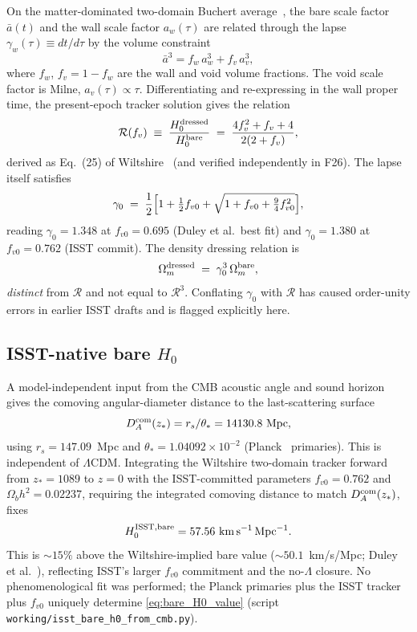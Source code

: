 \documentclass[aps,prd,twocolumn,nofootinbib,floatfix,superscriptaddress]{revtex4-2}
\begin{document}
On the matter-dominated two-domain Buchert
average~\cite{Wiltshire2007,Wiltshire2009}, the bare scale factor
$\bar a(t)$ and the wall scale factor $a_w(\tau)$ are related
through the lapse $\gamma_w(\tau) \equiv dt/d\tau$ by the volume
constraint
\begin{equation}
\bar a^3 = f_w\,a_w^3 + f_v\,a_v^3,
\end{equation}
where $f_w$, $f_v = 1-f_w$ are the wall and void volume
fractions. The void scale factor is Milne, $a_v(\tau) \propto \tau$.
Differentiating and re-expressing in the wall proper time, the
present-epoch tracker solution gives the relation
\begin{equation}
\label{eq:R_dressing}
\mathcal{R}(f_v) \;\equiv\; \frac{H_0^{\rm dressed}}{H_0^{\rm bare}}
\;=\; \frac{4f_v^2 + f_v + 4}{2(2 + f_v)},
\end{equation}
derived as Eq.~(25) of Wiltshire~\cite{WiltshirePRL2007} (and
verified independently in F26). The lapse itself satisfies
\begin{equation}
\gamma_0 \;=\; \frac{1}{2}\Bigl[1 + \tfrac{1}{2}f_{v0} +
   \sqrt{1 + f_{v0} + \tfrac{9}{4}f_{v0}^2}\Bigr],
\end{equation}
reading $\gamma_0 = 1.348$ at $f_{v0} = 0.695$ (Duley et al.\ best
fit) and $\gamma_0 = 1.380$ at $f_{v0} = 0.762$ (ISST commit). The
density dressing relation is
\begin{equation}
\Omega_m^{\rm dressed} \;=\; \gamma_0^3\,\Omega_m^{\rm bare},
\end{equation}
\emph{distinct} from $\mathcal{R}$ and not equal to
$\mathcal{R}^3$. Conflating $\gamma_0$ with $\mathcal{R}$ has
caused order-unity errors in earlier ISST drafts and is flagged
explicitly here.

\subsection{ISST-native bare $H_0$}
\label{sec:bare_h0}

A model-independent input from the CMB acoustic angle and sound
horizon gives the comoving angular-diameter distance to the
last-scattering surface
\begin{equation}
D_A^{\rm com}(z_*) = r_s/\theta_* = 14130.8~\text{Mpc},
\end{equation}
using $r_s = 147.09$~Mpc and $\theta_* = 1.04092\times 10^{-2}$
(Planck~\cite{Planck2018} primaries). This is independent of
$\Lambda$CDM. Integrating the Wiltshire two-domain tracker
forward from $z_* = 1089$ to $z = 0$ with the ISST-committed
parameters $f_{v0} = 0.762$ and $\Omega_b h^2 = 0.02237$, requiring
the integrated comoving distance to match $D_A^{\rm com}(z_*)$,
fixes
\begin{equation}
\label{eq:bare_H0_value}
H_0^{\rm ISST,bare} = 57.56~{\rm km\,s^{-1}\,Mpc^{-1}}.
\end{equation}
This is $\sim 15\%$ above the Wiltshire-implied bare value
($\sim 50.1$~km/s/Mpc; Duley et al.~\cite{Dam2017}), reflecting
ISST's larger $f_{v0}$ commitment and the no-$\Lambda$ closure. No
phenomenological fit was performed; the Planck primaries plus the
ISST tracker plus $f_{v0}$ uniquely determine
\eqref{eq:bare_H0_value} (script
\texttt{working/isst\_bare\_h0\_from\_cmb.py}).
\end{document}
